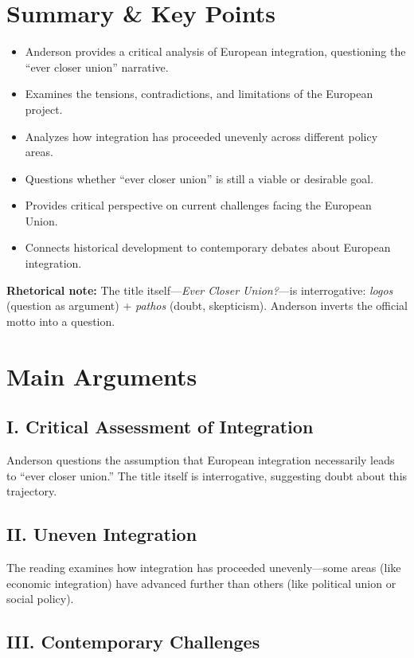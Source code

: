 \documentclass[11pt,a4paper]{article}
\begin{document}
\section*{Summary \& Key Points}

\begin{itemize}
\item Anderson provides a critical analysis of European integration, questioning the ``ever closer union'' narrative.
\item Examines the tensions, contradictions, and limitations of the European project.
\item Analyzes how integration has proceeded unevenly across different policy areas.
\item Questions whether ``ever closer union'' is still a viable or desirable goal.
\item Provides critical perspective on current challenges facing the European Union.
\item Connects historical development to contemporary debates about European integration.
\end{itemize}

\textbf{Rhetorical note:} The title itself---\textit{Ever Closer Union?}---is interrogative: \textit{logos} (question as argument) + \textit{pathos} (doubt, skepticism). Anderson inverts the official motto into a question.

\section*{Main Arguments}

\subsection*{I. Critical Assessment of Integration}

Anderson questions the assumption that European integration necessarily leads to ``ever closer union.'' The title itself is interrogative, suggesting doubt about this trajectory.

\subsection*{II. Uneven Integration}

The reading examines how integration has proceeded unevenly---some areas (like economic integration) have advanced further than others (like political union or social policy).

\subsection*{III. Contemporary Challenges}
\end{document}
